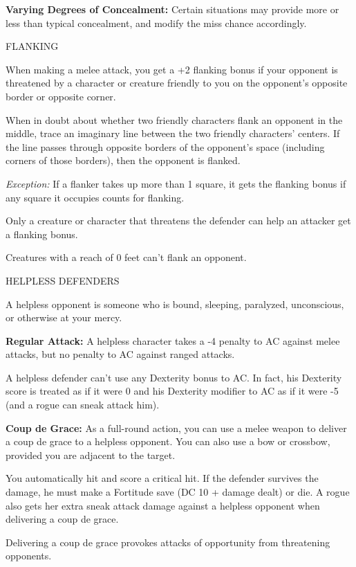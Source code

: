 \documentclass{article}
\begin{document}
\textbf{Varying Degrees of Concealment:} Certain situations may provide more or 
less than typical concealment, and modify the miss chance accordingly.

\vspace{12pt}
FLANKING

When making a melee attack, you get a +2 flanking bonus if your opponent is threatened 
by a character or creature friendly to you on the opponent's opposite border or 
opposite corner.

When in doubt about whether two friendly characters flank an opponent in the middle, 
trace an imaginary line between the two friendly characters' centers. If the line 
passes through opposite borders of the opponent's space (including corners of those 
borders), then the opponent is flanked.

\textit{Exception: }If a flanker takes up more than 1 square, it gets the flanking 
bonus if any square it occupies counts for flanking.

Only a creature or character that threatens the defender can help an attacker get 
a flanking bonus.

Creatures with a reach of 0 feet can't flank an opponent.

\vspace{12pt}
HELPLESS DEFENDERS

A helpless opponent is someone who is bound, sleeping, paralyzed, unconscious, 
or otherwise at your mercy.

\textbf{Regular Attack:} A helpless character takes a -4 penalty to AC against 
melee attacks, but no penalty to AC against ranged attacks.

A helpless defender can't use any Dexterity bonus to AC. In fact, his Dexterity 
score is treated as if it were 0 and his Dexterity modifier to AC as if it were 
-5 (and a rogue can sneak attack him).

\textbf{Coup de Grace:} As a full-round action, you can use a melee weapon to deliver 
a coup de grace to a helpless opponent. You can also use a bow or crossbow, provided 
you are adjacent to the target.

You automatically hit and score a critical hit. If the defender survives the damage, 
he must make a Fortitude save (DC 10 + damage dealt) or die. A rogue also gets 
her extra sneak attack damage against a helpless opponent when delivering a coup 
de grace.

Delivering a coup de grace provokes attacks of opportunity from threatening opponents.
\end{document}
